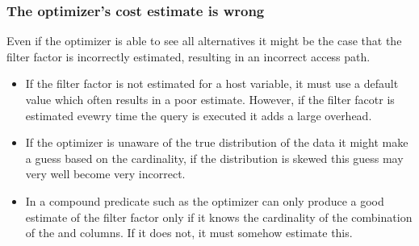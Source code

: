\subsubsection{The optimizer's cost estimate is wrong}
Even if the optimizer is able to see all alternatives it might be the case that the filter factor is incorrectly estimated, resulting in an incorrect access path.

\begin{itemize}
    \item If the filter factor is not estimated for a host variable, it must use a default value which often results in a poor estimate. However, if the filter facotr is estimated evewry time the query is executed it adds a large overhead.
    \item If the optimizer is unaware of the true distribution of the data it might make a guess based on the cardinality, if the distribution is skewed this guess may very well become very incorrect.
    \item In a compound predicate such as  the optimizer can only produce a good estimate of the filter factor only if it knows the cardinality of the combination of the  and  columns. If it does not, it must somehow estimate this.
\end{itemize}
